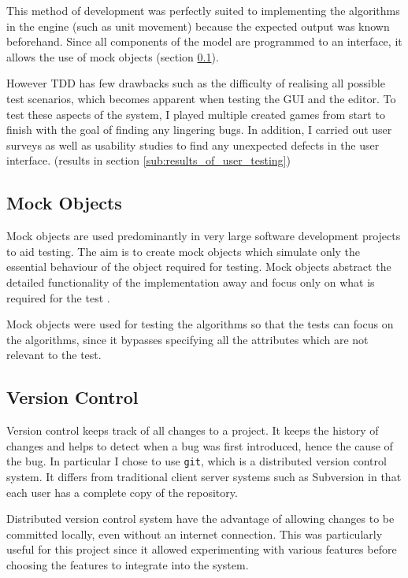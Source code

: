 This method of development was perfectly suited to implementing the algorithms in the engine (such as unit movement) because the expected output was known beforehand.  Since all components of the model are programmed to an interface, it allows the use of mock objects (section \ref{sec:mockobjects}).   


However TDD has few drawbacks such as the difficulty of realising all possible test scenarios, which becomes apparent when testing the GUI and the editor. To test these aspects of the system, I played multiple created games from start to finish with the goal of finding any lingering bugs. In addition, I carried out user surveys as well as usability studies to find any unexpected defects in the user interface. (results in section \ref{sub:results_of_user_testing}) 

\subsection{Mock Objects}
\label{sec:mockobjects}
Mock objects are used predominantly in very large software development projects to aid testing. The aim is to create mock objects which simulate only the essential behaviour of the object required for testing. 
Mock objects abstract  the detailed functionality of the implementation away and  focus only on what is required for the test \cite{Freeman:2009:GOS:1655852}.

Mock objects were used for testing the algorithms so that the tests can focus on the algorithms, since it bypasses specifying all the attributes which are not relevant to the test.  

\subsection{Version Control}
\label{sub:version_control}
Version control keeps track of all changes to a project. It keeps the history of changes and  helps to detect when a bug was first introduced, hence the cause of the bug. In particular I chose to use \texttt{git}, which is a distributed version control system\cite{Chacon:2009:PG:1618548}. It differs from traditional client server systems such as Subversion in that each user has a 
complete copy of the repository. 

Distributed version control system have the advantage of allowing changes to be committed locally, even without an internet connection.  This was particularly useful for this project since it allowed experimenting with various features before choosing the features to integrate into the system.

